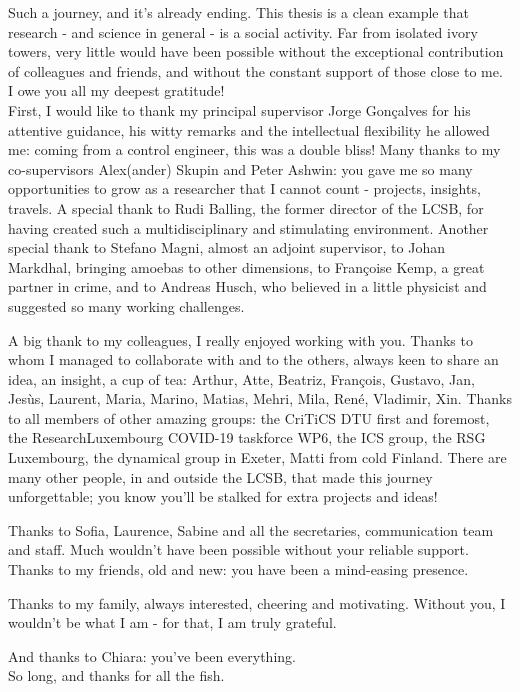 
\begin{acknowledgements}      

Such a journey, and it's already ending. This thesis is a clean example that research - and science in general - is a social activity. Far from isolated ivory towers, very little would have been possible without the exceptional contribution of colleagues and friends, and without the constant support of those close to me. I owe you all my deepest gratitude!\\

First, I would like to thank my principal supervisor Jorge Gonçalves for his attentive guidance, his witty remarks and the intellectual flexibility he allowed me: coming from a control engineer, this was a double bliss! Many thanks to my co-supervisors Alex(ander) Skupin and Peter Ashwin: you gave me so many opportunities to grow as a researcher that I cannot count - projects, insights, travels. A special thank to Rudi Balling, the former director of the LCSB, for having created such a multidisciplinary and stimulating environment. Another special thank to Stefano Magni, almost an adjoint supervisor, to Johan Markdhal, bringing amoebas to other dimensions, to Françoise Kemp, a great partner in crime, and to Andreas Husch, who believed in a little physicist and suggested so many working challenges.

A big thank to my colleagues, I really enjoyed working with you. Thanks to whom I managed to collaborate with and to the others, always keen to share an idea, an insight, a cup of tea: Arthur, Atte, Beatriz, François, Gustavo, Jan, Jesùs, Laurent, Maria, Marino, Matias, Mehri, Mila, René, Vladimir, Xin. Thanks to all members of other amazing groups: the CriTiCS DTU first and foremost, the ResearchLuxembourg COVID-19 taskforce WP6, the ICS group, the RSG Luxembourg, the dynamical group in Exeter, Matti from cold Finland. There are many other people, in and outside the LCSB, that made this journey unforgettable; you know you'll be stalked for extra projects and ideas!

Thanks to Sofia, Laurence, Sabine and all the secretaries, communication team and staff. Much wouldn't have been possible without your reliable support. \\

Thanks to my friends, old and new: you have been a mind-easing presence.

Thanks to my family, always interested, cheering and motivating. Without you, I wouldn't be what I am - for that, I am truly grateful.

And thanks to Chiara: you've been everything. \\

So long, and thanks for all the fish.

\end{acknowledgements}
